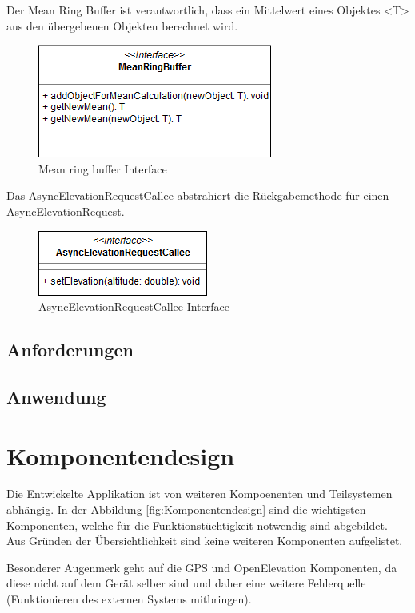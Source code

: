 \documentclass[a4paper]{scrreprt}
\begin{document}
Der Mean Ring Buffer ist verantwortlich, dass ein Mittelwert eines Objektes <T> aus den übergebenen Objekten berechnet wird.
\begin{figure}[h!]
	\center
	\includegraphics[scale=0.6]{MeanRingBuffer.png}
	\caption{Mean ring buffer Interface}
\end{figure}

Das AsyncElevationRequestCallee abstrahiert die Rückgabemethode für einen AsyncElevationRequest.
\begin{figure}[h!]
	\center
	\includegraphics[scale=0.6]{AsyncElevationRequestCallee.png}
	\caption{AsyncElevationRequestCallee Interface}
\end{figure}

\subsection{Anforderungen}

\subsection{Anwendung}

\section{Komponentendesign}

Die Entwickelte Applikation ist von weiteren Kompoenenten und Teilsystemen abhängig. In der Abbildung \ref{fig:Komponentendesign} sind die wichtigsten Komponenten, welche für die Funktionstüchtigkeit notwendig sind abgebildet. Aus Gründen der Übersichtlichkeit sind keine weiteren Komponenten aufgelistet.

Besonderer Augenmerk geht auf die GPS und OpenElevation Komponenten, da diese nicht auf dem Gerät selber sind und daher eine weitere Fehlerquelle (Funktionieren des externen Systems mitbringen).
\end{document}

